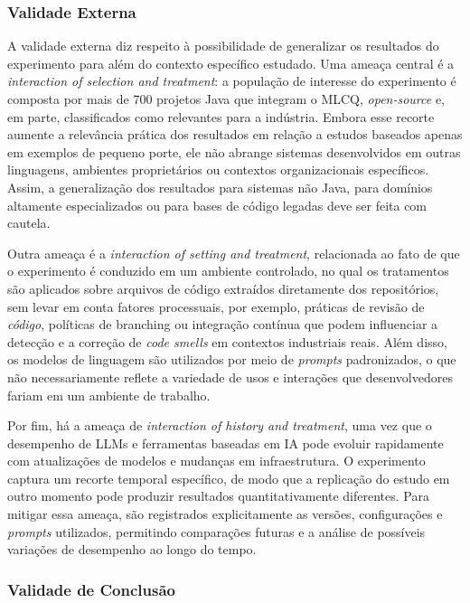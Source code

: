 \subsubsection*{Validade Externa}

A validade externa diz respeito à possibilidade de generalizar os resultados do experimento para além do contexto específico estudado. Uma ameaça central é a 
\textit{interaction of selection and treatment}: a população de interesse do experimento é composta por mais de 700 projetos Java que integram o MLCQ, 
\textit{open-source} e, em parte, classificados como relevantes para a indústria. Embora esse recorte aumente a relevância prática dos resultados em relação 
a estudos baseados apenas em exemplos de pequeno porte, ele não abrange sistemas desenvolvidos em outras linguagens, ambientes proprietários ou contextos 
organizacionais específicos. Assim, a generalização dos resultados para sistemas não Java, para domínios altamente especializados ou para bases de código 
legadas deve ser feita com cautela.

Outra ameaça é a \textit{interaction of setting and treatment}, relacionada ao fato de que o experimento é conduzido em um ambiente controlado, no qual os 
tratamentos são aplicados sobre arquivos de código extraídos diretamente dos repositórios, sem levar em conta fatores processuais, por exemplo, práticas de 
revisão de \textit{código}, políticas de branching ou integração contínua que podem influenciar a detecção e a correção de \textit{code smells} em contextos 
industriais reais. Além disso, os modelos de linguagem são utilizados por meio de \textit{prompts} padronizados, o que não necessariamente reflete a variedade 
de usos e interações que desenvolvedores fariam em um ambiente de trabalho.

Por fim, há a ameaça de \textit{interaction of history and treatment}, uma vez que o desempenho de LLMs e ferramentas baseadas em IA pode evoluir rapidamente 
com atualizações de modelos e mudanças em infraestrutura. O experimento captura um recorte temporal específico, de modo que a replicação do estudo em outro 
momento pode produzir resultados quantitativamente diferentes. Para mitigar essa ameaça, são registrados explicitamente as versões, configurações e 
\textit{prompts} utilizados, permitindo comparações futuras e a análise de possíveis variações de desempenho ao longo do tempo.

\subsubsection*{Validade de Conclusão}

